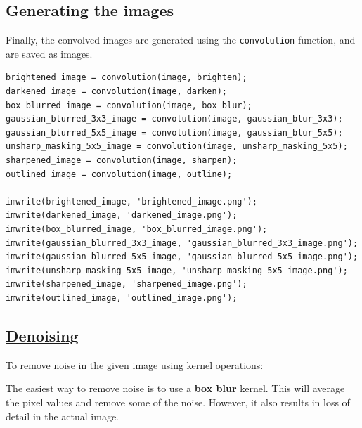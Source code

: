 \documentclass[12pt]{report}
\begin{document}
\subsection{Generating the images}
Finally, the convolved images are generated using the \texttt{convolution} function, and are saved as images.

\begin{lstlisting}
brightened_image = convolution(image, brighten);
darkened_image = convolution(image, darken);
box_blurred_image = convolution(image, box_blur);
gaussian_blurred_3x3_image = convolution(image, gaussian_blur_3x3);
gaussian_blurred_5x5_image = convolution(image, gaussian_blur_5x5);
unsharp_masking_5x5_image = convolution(image, unsharp_masking_5x5);
sharpened_image = convolution(image, sharpen);
outlined_image = convolution(image, outline);

imwrite(brightened_image, 'brightened_image.png');
imwrite(darkened_image, 'darkened_image.png');
imwrite(box_blurred_image, 'box_blurred_image.png');
imwrite(gaussian_blurred_3x3_image, 'gaussian_blurred_3x3_image.png');
imwrite(gaussian_blurred_5x5_image, 'gaussian_blurred_5x5_image.png');
imwrite(unsharp_masking_5x5_image, 'unsharp_masking_5x5_image.png');
imwrite(sharpened_image, 'sharpened_image.png');
imwrite(outlined_image, 'outlined_image.png');
\end{lstlisting}

\subsection{\href{https://vincmazet.github.io/bip/restoration/denoising.html}{Denoising}}

To remove noise in the given image using kernel operations:

The easiest way to remove noise is to use a \textbf{box blur} kernel. This will average the pixel values and remove some of the noise. However, it also results in loss of detail in the actual image.
\end{document}
